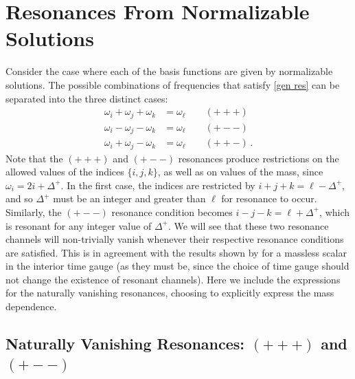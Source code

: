 \documentclass[letterpaper,11pt]{article}
\newcommand{\oi}{\omega_i}
\newcommand{\oj}{\omega_j}
\newcommand{\ok}{\omega_k}
\newcommand{\ol}{\omega_\ell}
\begin{document}
\section{Resonances From Normalizable Solutions}
\label{sec: norm res}
Consider the case where each of the basis functions are given by normalizable solutions. The possible combinations of frequencies that satisfy \eqref{gen res} can be separated into the three distinct cases:
\begin{align}
\oi + \oj + \ok &= \ol \qquad (+++) \\
\oi - \oj - \ok &= \ol \qquad (+--) \\
\oi + \oj - \ok &= \ol \qquad (++-) \, .
\end{align}
Note that the $(+++)$ and $(+--)$ resonances produce restrictions on the allowed values of the indices $\{i, j, k\}$, as well as on values of the mass, since $\oi = 2 i + \Delta^+$. In the first case, the indices are restricted by ${i + j + k = \ell - \Delta^+}$, and so $\Delta^+$ must be an integer and greater than $\ell$ for resonance to occur. Similarly, the $(+--)$ resonance condition becomes ${i - j - k = \ell + \Delta^+}$, which is resonant for any integer value of $\Delta^+$. We will see that these two resonance channels will non-trivially vanish whenever their respective resonance conditions are satisfied. This is in agreement with the results shown by \cite{1407.6273} for a massless scalar in the interior time gauge (as they must be, since the choice of time gauge should not change the existence of resonant channels). Here we include the expressions for the naturally vanishing resonances, choosing to explicitly express the mass dependence. 


\subsection{Naturally Vanishing Resonances: $(+++)$ and $(+--)$}
\label{ssec: zero resonance}
\end{document}
